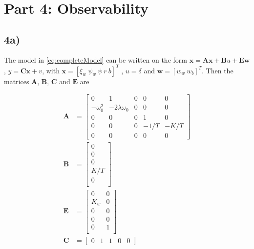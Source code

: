 
\section{Part 4: Observability}

\subsection{4a)}

The model in \cref{eq:completeModel} can be written on the form $\mathbf{\dot x} = \mathbf{A} \mathbf{x} + \mathbf{B}u + \mathbf{E}\mathbf{w}$, $ y = \mathbf{C}\mathbf{x} + v$, with $\mathbf{x} = [ \xi_w\ \psi_w\ \psi\ r\ b]^ T $ , $ u = \delta $ and $ \mathbf{w} = [w_w\ w_b]^T$. Then the matrices $\mathbf{A}$, $\mathbf{B}$, $\mathbf{C}$ and $\mathbf{E}$ are

\begin{subequations}
    \begin{align}
        \mathbf{A} &= \begin{bmatrix}
        0 & 1 & 0 & 0 & 0 \\
        -\omega_0^2 & -2\lambda\omega_0 & 0 & 0 & 0 \\
        0 & 0 & 0 & 1 & 0 \\
        0 & 0 & 0 & -1/T & -K/T \\
        0 & 0 & 0 & 0 & 0
        \end{bmatrix} \\
        \mathbf{B} &= \begin{bmatrix}
        0 \\
        0 \\
        0 \\
        K/T \\
        0 \\
        \end{bmatrix} \\
        \mathbf{E} &= \begin{bmatrix}
        0 & 0 \\
        K_w & 0 \\
        0 & 0 \\
        0 & 0 \\
        0 & 1 \\
        \end{bmatrix} \\
        \mathbf{C} &= \begin{bmatrix}
        0 & 1 & 1 & 0 & 0
        \end{bmatrix}
    \end{align}
\end{subequations}

